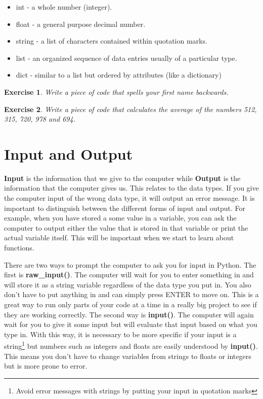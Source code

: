 \documentclass[12pt]{amsart}
\newtheorem{quest}{Exercise}
\theoremstyle{definition}
\begin{document}
\begin{itemize}
  \item int - a whole number (integer).
  \item float - a general purpose decimal number.
  \item string - a list of characters contained within quotation marks.
  \item list - an organized sequence of data entries usually of a particular type.
  \item dict - similar to a list but ordered by attributes (like a dictionary)
\end{itemize}

\begin{quest}
Write a piece of code that spells your first name backwards.
\end{quest}
\begin{quest}
Write a piece of code that calculates the average of the numbers 512, 315, 720, 978 and 694.
\end{quest}

\section{Input and Output}%

\textbf{Input} is the information that we give to the computer while \textbf{Output} is the information that the computer gives us. This relates to the data types. If you give the computer input of the wrong data type, it will output an error message. It is important to distinguish between the different forms of input and output. For example, when you have stored a some value in a variable, you can ask the computer to output either the value that is stored in that variable or print the actual variable itself. This will be important when we start to learn about functions.

There are two ways to prompt the computer to ask you for input in Python. The first is \textbf{raw\_input()}. The computer will wait for you to enter something in and will store it as a string variable regardless of the data type you put in. You also don't have to put anything in and can simply press ENTER to move on. This is a great way to run only parts of your code at a time in a really big project to see if they are working correctly. The second way is \textbf{input()}. The computer will again wait for you to give it some input but will evaluate that input based on what you type in. With this way, it is necessary to be more specific if your input is a string\footnote{Avoid error messages with strings by putting your input in quotation marks} but numbers such as integers and floats are easily understood by \textbf{input()}. This means you don't have to change variables from strings to floats or integers but is more prone to error.
\end{document}
